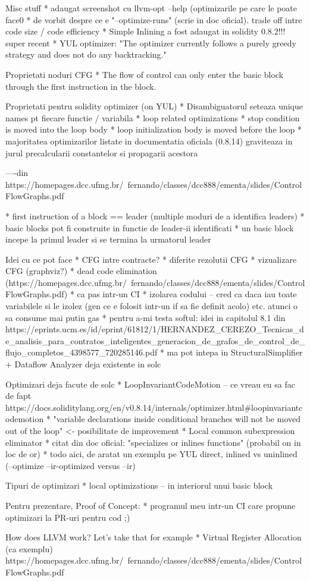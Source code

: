Misc stuff
* adaugat screenshot cu llvm-opt --help (optimizarile pe care le poate face0
* de vorbit despre ce e "--optimize-runs" (scrie in doc oficial). trade off intre code size / code efficiency
* Simple Inlining a fost adaugat in solidity 0.8.2!!! super recent
* YUL optimizer: "The optimizer currently follows a purely greedy strategy and does not do any backtracking."

Proprietati noduri CFG
* The	flow	of	control	can	only	
enter	the	basic	block	through	
the	first	instruction	in	the	
block.

Proprietati pentru solidity optimizer (on YUL)
* Disambiguatorul seteaza unique names pt fiecare functie / variabila
* loop related optimizations
  * stop condition is moved into the loop body
  * loop initialization body is moved before the loop
  * majoritatea optimizarilor listate in documentatia oficiala (0.8.14) graviteaza in jurul precalcularii constantelor si propagarii acestora

----din https://homepages.dcc.ufmg.br/~fernando/classes/dcc888/ementa/slides/ControlFlowGraphs.pdf

* first instruction of a block == leader (multiple moduri de a identifica leaders)
* basic blocks pot fi construite in functie de leader-ii identificati
  * un basic block incepe la primul leader si se termina la urmatorul leader

Idei cu ce pot face
* CFG intre contracte?
* diferite rezolutii CFG
* vizualizare CFG (graphviz?)
* dead code elimination (https://homepages.dcc.ufmg.br/~fernando/classes/dcc888/ementa/slides/ControlFlowGraphs.pdf)
  * ca pas intr-un CI
* izolarea codului – cred ca daca iau toate variabilele si le izolez (gen ce e folosit intr-un if sa fie definit acolo) etc. atunci o sa consume mai putin gas
* pentru a-mi testa softul: idei in capitolul 8.1 din https://eprints.ucm.es/id/eprint/61812/1/HERNANDEZ_CEREZO_Tecnicas_de_analisis_para_contratos_inteligentes_generacion_de_grafos_de_control_de_flujo_completos_4398577_720285146.pdf
* ma pot intepa in StructuralSimplifier + Dataflow Analyzer deja existente in solc

Optimizari deja facute de solc
* LoopInvariantCodeMotion – ce vreau eu sa fac de fapt https://docs.soliditylang.org/en/v0.8.14/internals/optimizer.html#loopinvariantcodemotion
  * "variable declarations inside conditional branches will not be moved out of the loop" <- posibilitate de improvement
* Local common subexpression eliminator
* citat din doc oficial: "specializes or inlines functions" (probabil on in loc de or)
  * todo aici, de aratat un exemplu pe YUL direct, inlined vs uninlined (--optimize --ir-optimized versus --ir)


Tipuri de optimizari
* local optimizations – in interiorul unui basic block

Pentru prezentare, Proof of Concept:
* programul meu intr-un CI care propune optimizari la PR-uri pentru cod ;)


How does LLVM work? Let's take that for example
* Virtual Register Allocation (ca exemplu)
https://homepages.dcc.ufmg.br/~fernando/classes/dcc888/ementa/slides/ControlFlowGraphs.pdf